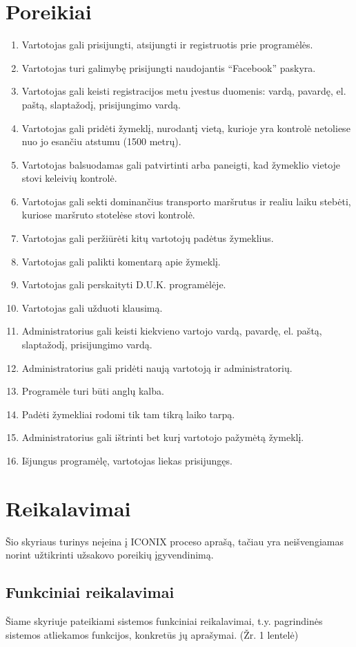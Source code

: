 \documentclass{VUMIFPSkursinis}
\begin{document}
\section{Poreikiai}
\begin{enumerate}[itemsep=-2mm]
	\item Vartotojas gali prisijungti, atsijungti ir registruotis prie programėlės.
	\item Vartotojas turi galimybę prisijungti naudojantis “Facebook” paskyra.
	\item Vartotojas gali keisti registracijos metu įvestus duomenis: vardą, pavardę, el. paštą, slaptažodį, prisijungimo vardą.
	\item Vartotojas gali pridėti žymeklį, nurodantį vietą, kurioje yra kontrolė netoliese nuo jo esančiu atstumu (1500 metrų).
	\item Vartotojas balsuodamas gali patvirtinti arba paneigti, kad žymeklio vietoje stovi keleivių kontrolė.
	\item Vartotojas gali sekti dominančius transporto maršrutus ir realiu laiku stebėti, kuriose maršruto stotelėse stovi kontrolė. 
	\item Vartotojas gali peržiūrėti kitų vartotojų padėtus žymeklius. 
	\item Vartotojas gali palikti komentarą apie žymeklį. 
	\item Vartotojas gali perskaityti D.U.K. programėlėje.
	\item Vartotojas gali užduoti klausimą.
	\item Administratorius gali keisti kiekvieno vartojo vardą, pavardę, el. paštą, slaptažodį, prisijungimo vardą.
	\item Administratorius gali pridėti naują vartotoją ir administratorių.
	\item Programėle turi būti anglų kalba. 
	\item Padėti žymekliai rodomi tik tam tikrą laiko tarpą.
	\item Administratorius gali ištrinti bet kurį vartotojo pažymėtą žymeklį.
	\item Išjungus programėlę, vartotojas liekas prisijungęs.
\end{enumerate} 

\section{Reikalavimai}
Šio skyriaus turinys neįeina į ICONIX proceso aprašą, tačiau yra neišvengiamas norint užtikrinti užsakovo poreikių įgyvendinimą.
\subsection{Funkciniai reikalavimai }
Šiame skyriuje pateikiami sistemos funkciniai reikalavimai, t.y. pagrindinės sistemos atliekamos funkcijos, konkretūs jų aprašymai. (Žr. 1 lentelė)
\end{document}
